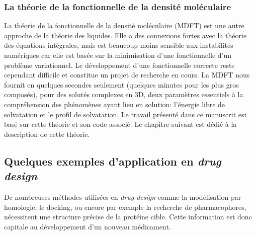 \subsubsection{La théorie de la fonctionnelle de la densité moléculaire}
La théorie de la fonctionnelle de la densité moléculaire\cite{jeanmairet_molecular_2013-1,jeanmairet_classical_2015,Jeanmairet_introduction_2014,jeanmairet_hydration_2014,levesque_solvation_2012} (MDFT) est une autre approche de la théorie des liquides. Elle a des connexions fortes avec la théorie des équations intégrales, mais est beaucoup moins sensible aux instabilités numériques car elle est basée sur la minimisation d'une fonctionnelle d'un problème variationnel. Le développement d'une fonctionnelle correcte reste cependant difficile et constitue un projet de recherche en cours. La MDFT nous fournit en quelques secondes seulement (quelques minutes pour les plus gros composés), pour des solutés complexes en 3D, deux paramètres essentiels à la compréhension des phénomènes ayant lieu en solution: l'énergie libre de solvatation et le profil de solvatation. Le travail présenté dans ce manuscrit est basé sur cette théorie et son code associé. Le chapitre suivant est dédié à la description de cette théorie.




















\subsection{Quelques exemples d'application en \textit{drug design}}
De nombreuses méthodes utilisées en \textit{drug design} comme la modélisation par homologie, le docking, ou encore par exemple la recherche de pharmacophores, nécessitent une structure précise de la protéine cible. Cette information est donc capitale au développement d'un nouveau médicament. 

